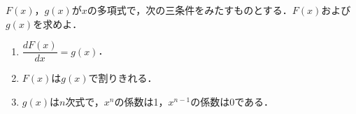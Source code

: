 \documentclass[../../main.tex]{subfiles}
\begin{document}
$F(x)$，$g(x)$が$x$の多項式で，次の三条件をみたすものとする．$F(x)$および$g(x)$を求めよ．
\begin{enumerate}
  \item $\displaystyle\dfrac{dF(x)}{dx}=g(x)$．
  \item $F(x)$は$g(x)$で割りきれる．
  \item $g(x)$は$n$次式で，$x^n$の係数は1，$x^{n-1}$の係数は0である．
\end{enumerate}
\end{document}
